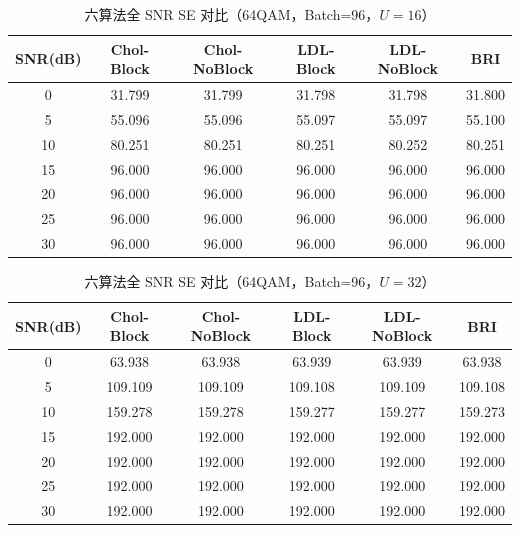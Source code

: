 \documentclass{CjC}
\begin{document}
    \begin{table}[H]
        \centering
        \caption{六算法全 SNR SE 对比（64QAM，Batch=96，$U=16$）}
        \begin{tabular}{c c c c c c}
            \toprule SNR(dB) & Chol-Block & Chol-NoBlock & LDL-Block & LDL-NoBlock & BRI    \\
            \midrule 0       & 31.799     & 31.799       & 31.798    & 31.798      & 31.800 \\
            5                & 55.096     & 55.096       & 55.097    & 55.097      & 55.100 \\
            10               & 80.251     & 80.251       & 80.251    & 80.252      & 80.251 \\
            15               & 96.000     & 96.000       & 96.000    & 96.000      & 96.000 \\
            20               & 96.000     & 96.000       & 96.000    & 96.000      & 96.000 \\
            25               & 96.000     & 96.000       & 96.000    & 96.000      & 96.000 \\
            30               & 96.000     & 96.000       & 96.000    & 96.000      & 96.000 \\
            \bottomrule
        \end{tabular}
    \end{table}

    \begin{table}[H]
        \centering
        \caption{六算法全 SNR SE 对比（64QAM，Batch=96，$U=32$）}
        \begin{tabular}{c c c c c c}
            \toprule SNR(dB) & Chol-Block & Chol-NoBlock & LDL-Block & LDL-NoBlock & BRI     \\
            \midrule 0       & 63.938     & 63.938       & 63.939    & 63.939      & 63.938  \\
            5                & 109.109    & 109.109      & 109.108   & 109.109     & 109.108 \\
            10               & 159.278    & 159.278      & 159.277   & 159.277     & 159.273 \\
            15               & 192.000    & 192.000      & 192.000   & 192.000     & 192.000 \\
            20               & 192.000    & 192.000      & 192.000   & 192.000     & 192.000 \\
            25               & 192.000    & 192.000      & 192.000   & 192.000     & 192.000 \\
            30               & 192.000    & 192.000      & 192.000   & 192.000     & 192.000 \\
            \bottomrule
        \end{tabular}
    \end{table}
\end{document}
